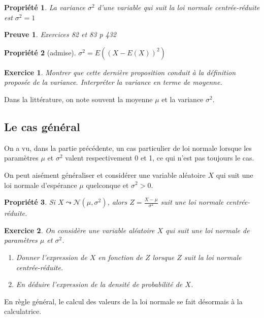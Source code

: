 \documentclass[11pt,a4paper,french]{article}
\theoremstyle{break}
\newtheorem{propriete}{Propriété}
\theoremstyle{plain}
\newtheorem{exerciceT}{Exercice}
\theoremstyle{nonumberplain}
\newtheorem{preuve}{Preuve}
\theoremstyle{nonumberbreak}
\newenvironment{exercice}{\begin{framed}\begin{exerciceT}}{\end{exerciceT}\end{framed}}
\begin{document}
\begin{propriete}
  La variance $\sigma^2$ d'une variable qui suit la loi normale
  centrée-réduite est $\sigma^2 = 1$
\end{propriete}
\begin{preuve}
  Exercices 82 et 83 p 432
\end{preuve}

\begin{propriete}[admise]
  $\sigma^2 = E((X - E(X))^2)$
\end{propriete}

\begin{exercice}
  Montrer que cette dernière proposition conduit à la définition
  proposée de la variance. Interpréter la variance en terme de
  moyenne.
\end{exercice}

Dans la littérature, on note souvent la moyenne $\mu$ et la variance
$\sigma^2$.

\pagebreak

\subsection{Le cas général}

On a vu, dans la partie précédente, un cas particulier de loi normale
lorsque les paramètres $\mu$ et $\sigma^2$ valent respectivement 0 et 1,
ce qui n'est pas toujours le cas.

On peut aisément généraliser et considérer une variable aléatoire $X$
qui suit une loi normale d'espérance $\mu$ quelconque et $\sigma^2 > 0$.

\begin{propriete}
  Si $X \leadsto \mathcal{N}(\mu,\sigma^2)$, alors $Z = \frac{ X -
  \mu}{\sigma^2}$ suit une loi normale centrée-réduite.
\end{propriete}

\begin{exercice}
  On considère une variable aléatoire $X$ qui suit une loi normale de
  paramètres $\mu$ et $\sigma^2$.
  \begin{enumerate}
    \item Donner l'expression de $X$ en fonction de $Z$ lorsque $Z$ suit
      la loi normale centrée-réduite.
    \item En déduire l'expression de la densité de probabilité de $X$.
  \end{enumerate}
\end{exercice}

En règle général, le calcul des valeurs de la loi normale se fait
désormais à la calculatrice.
\end{document}
